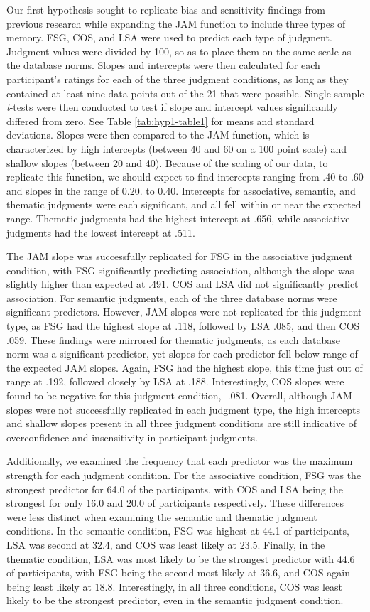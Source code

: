 \documentclass[english,man]{apa6}
\theoremstyle{definition}
\theoremstyle{definition}
\theoremstyle{remark}
\begin{document}
Our first hypothesis sought to replicate bias and sensitivity findings
from previous research while expanding the JAM function to include three
types of memory. FSG, COS, and LSA were used to predict each type of
judgment. Judgment values were divided by 100, so as to place them on
the same scale as the database norms. Slopes and intercepts were then
calculated for each participant's ratings for each of the three judgment
conditions, as long as they contained at least nine data points out of
the 21 that were possible. Single sample \emph{t}-tests were then
conducted to test if slope and intercept values significantly differed
from zero. See Table \ref{tab:hyp1-table1} for means and standard
deviations. Slopes were then compared to the JAM function, which is
characterized by high intercepts (between 40 and 60 on a 100 point
scale) and shallow slopes (between 20 and 40). Because of the scaling of
our data, to replicate this function, we should expect to find
intercepts ranging from .40 to .60 and slopes in the range of 0.20. to
0.40. Intercepts for associative, semantic, and thematic judgments were
each significant, and all fell within or near the expected range.
Thematic judgments had the highest intercept at .656, while associative
judgments had the lowest intercept at .511.

The JAM slope was successfully replicated for FSG in the associative
judgment condition, with FSG significantly predicting association,
although the slope was slightly higher than expected at .491. COS and
LSA did not significantly predict association. For semantic judgments,
each of the three database norms were significant predictors. However,
JAM slopes were not replicated for this judgment type, as FSG had the
highest slope at .118, followed by LSA .085, and then COS .059. These
findings were mirrored for thematic judgments, as each database norm was
a significant predictor, yet slopes for each predictor fell below range
of the expected JAM slopes. Again, FSG had the highest slope, this time
just out of range at .192, followed closely by LSA at .188.
Interestingly, COS slopes were found to be negative for this judgment
condition, -.081. Overall, although JAM slopes were not successfully
replicated in each judgment type, the high intercepts and shallow slopes
present in all three judgment conditions are still indicative of
overconfidence and insensitivity in participant judgments.

Additionally, we examined the frequency that each predictor was the
maximum strength for each judgment condition. For the associative
condition, FSG was the strongest predictor for 64.0 of the participants,
with COS and LSA being the strongest for only 16.0 and 20.0 of
participants respectively. These differences were less distinct when
examining the semantic and thematic judgment conditions. In the semantic
condition, FSG was highest at 44.1 of participants, LSA was second at
32.4, and COS was least likely at 23.5. Finally, in the thematic
condition, LSA was most likely to be the strongest predictor with 44.6
of participants, with FSG being the second most likely at 36.6, and COS
again being least likely at 18.8. Interestingly, in all three
conditions, COS was least likely to be the strongest predictor, even in
the semantic judgment condition.
\end{document}
